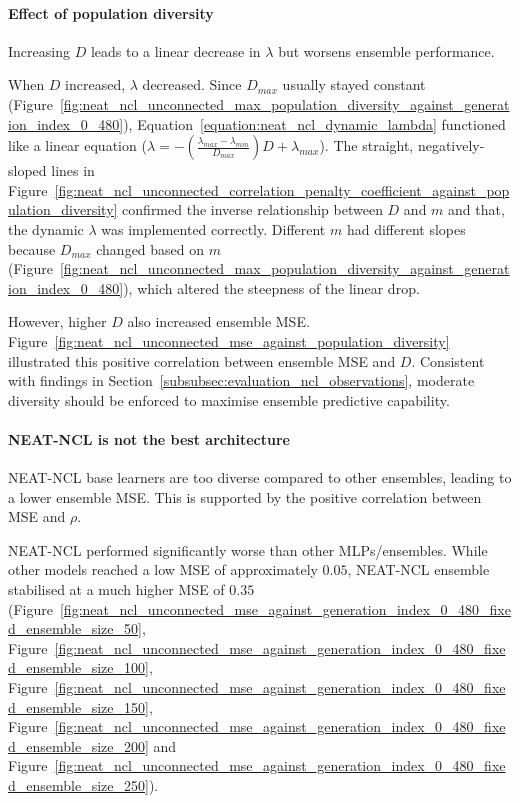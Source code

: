 \paragraph{Effect of population diversity}
Increasing $D$ leads to a linear decrease in $\lambda$ but worsens ensemble performance. 

When $D$ increased, $\lambda$ decreased. Since $D_{max}$ usually stayed constant (Figure~\ref{fig:neat_ncl_unconnected_max_population_diversity_against_generation_index_0_480}), Equation~\ref{equation:neat_ncl_dynamic_lambda} functioned like a linear equation ($\lambda = -(\frac{\lambda_{max} - \lambda_{min}}{D_{max}})D + \lambda_{max}$). The straight, negatively-sloped lines in Figure~\ref{fig:neat_ncl_unconnected_correlation_penalty_coefficient_against_population_diversity} confirmed the inverse relationship between $D$ and $m$ and that, the dynamic $\lambda$ was implemented correctly. Different $m$ had different slopes because $D_{max}$ changed based on $m$ (Figure~\ref{fig:neat_ncl_unconnected_max_population_diversity_against_generation_index_0_480}), which altered the steepness of the linear drop. 

However, higher $D$ also increased ensemble MSE. Figure~\ref{fig:neat_ncl_unconnected_mse_against_population_diversity} illustrated this positive correlation between ensemble MSE and $D$. Consistent with findings in Section~\ref{subsubsec:evaluation_ncl_observations}, moderate diversity should be enforced to maximise ensemble predictive capability. 

\paragraph{NEAT-NCL is not the best architecture}
NEAT-NCL base learners are too diverse compared to other ensembles, leading to a lower ensemble MSE. This is supported by the positive correlation between MSE and $\rho$. 

NEAT-NCL performed significantly worse than other MLPs/ensembles. While other models reached a low MSE of approximately $0.05$, NEAT-NCL ensemble stabilised at a much higher MSE of $0.35$ (Figure~\ref{fig:neat_ncl_unconnected_mse_against_generation_index_0_480_fixed_ensemble_size_50}, Figure~\ref{fig:neat_ncl_unconnected_mse_against_generation_index_0_480_fixed_ensemble_size_100}, Figure~\ref{fig:neat_ncl_unconnected_mse_against_generation_index_0_480_fixed_ensemble_size_150}, Figure~\ref{fig:neat_ncl_unconnected_mse_against_generation_index_0_480_fixed_ensemble_size_200} and Figure~\ref{fig:neat_ncl_unconnected_mse_against_generation_index_0_480_fixed_ensemble_size_250}). 

